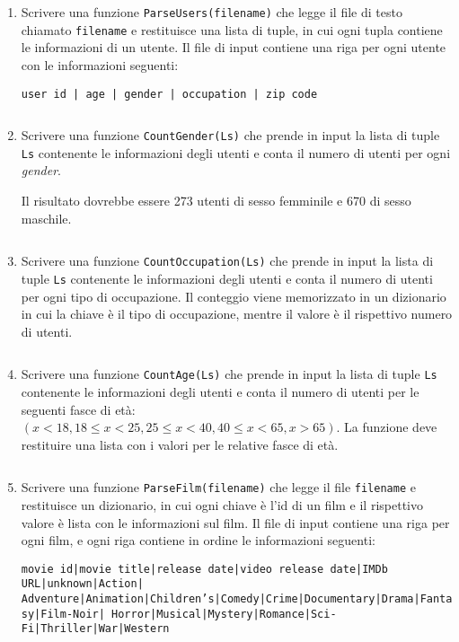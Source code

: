 \documentclass[11pt,a4]{article}
\newcommand{\mybox}[2]{$\quad$\fbox{
\begin{minipage}{#1cm}
\hfill\vspace{#2cm}
\end{minipage}
}}
\begin{document}
\begin{enumerate}
\item Scrivere una funzione {\tt ParseUsers(filename)} che legge il file di testo chiamato {\tt filename}
e restituisce una lista di tuple, in cui ogni tupla contiene le informazioni di un utente.
Il file di input contiene una riga per ogni utente con le informazioni seguenti:
\begin{center}
{\tt user id | age | gender | occupation | zip code}
\end{center}

\mybox{15}{2}

\item Scrivere una funzione {\tt CountGender(Ls)} che prende in input la lista di tuple {\tt Ls}
contenente le informazioni degli utenti e conta il numero di utenti per ogni {\it gender}.

Il risultato dovrebbe essere 273 utenti di sesso femminile e 670 di sesso maschile.

\mybox{15}{2}

\item Scrivere una funzione {\tt CountOccupation(Ls)} che prende in input la lista di tuple {\tt Ls}
contenente le informazioni degli utenti e conta il numero di utenti per ogni tipo di occupazione.
Il conteggio viene memorizzato in un dizionario in cui la chiave è il tipo di occupazione, mentre il valore
è il rispettivo numero di utenti.

\mybox{15}{2.5}

\item Scrivere una funzione {\tt CountAge(Ls)} che prende in input la lista di tuple {\tt Ls}
contenente le informazioni degli utenti e conta il numero di utenti per le seguenti fasce di età:
$(x<18, 18\leq x <25, 25 \leq x < 40, 40 \leq x < 65, x > 65)$. La funzione deve restituire una lista
con i valori per le relative fasce di età.

\mybox{15}{2.5}

\item Scrivere una funzione {\tt ParseFilm(filename)} che legge il file {\tt filename}
e restituisce un dizionario, in cui ogni chiave è l'id di un film e il rispettivo valore 
è lista con le informazioni sul film.
Il file di input contiene una riga per ogni film, e ogni riga contiene in ordine le informazioni seguenti:
\begin{center}
{\tt movie id|movie title|release date|video release date|IMDb URL|unknown|Action|
Adventure|Animation|Children's|Comedy|Crime|Documentary|Drama|Fantasy|Film-Noir|
Horror|Musical|Mystery|Romance|Sci-Fi|Thriller|War|Western}
\end{center}


\end{enumerate}
\end{document}
